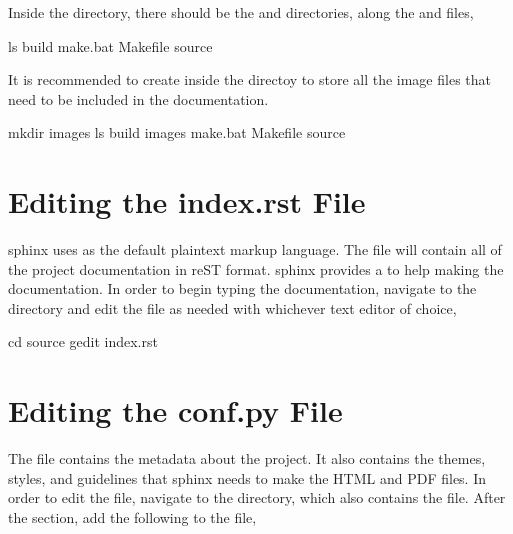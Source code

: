 \documentclass[letterpaper,10pt,english]{sphinxhowto}
\begin{document}
Inside the  directory, there should be the  and  directories, along the  and  files,

\begin{sphinxVerbatim}[commandchars=\\\{\}]
\PYGZdl{} ls
build  make.bat  Makefile  source
\end{sphinxVerbatim}

It is recommended to create inside the  directoy to store all the image files that need to be included in the documentation.

\begin{sphinxVerbatim}[commandchars=\\\{\}]
\PYGZdl{} mkdir images
\PYGZdl{} ls
build  images  make.bat  Makefile  source
\end{sphinxVerbatim}


\section{Editing the index.rst File}
\label{\detokenize{index:editing-the-index-rst-file}}
sphinx uses  as the default plaintext markup language. The  file will contain all of the project documentation in reST format. sphinx provides a  to help making the documentation. In order to begin typing the documentation, navigate to the  directory and edit the  file as needed with whichever text editor of choice,

\begin{sphinxVerbatim}[commandchars=\\\{\}]
\PYGZdl{} cd source
\PYGZdl{} gedit index.rst
\end{sphinxVerbatim}


\section{Editing the conf.py File}
\label{\detokenize{index:editing-the-conf-py-file}}
The  file contains the metadata about the project. It also contains the themes, styles, and guidelines that sphinx needs to make the HTML and PDF files. In order to edit the  file, navigate to the  directory, which also contains the  file. After the  section, add the following to the file,
\end{document}
